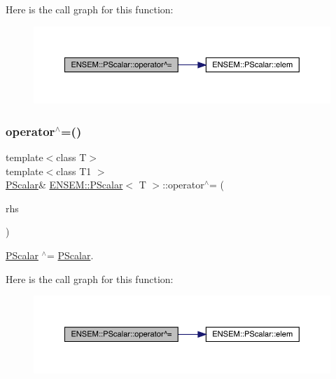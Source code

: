 Here is the call graph for this function\+:
\nopagebreak
\begin{figure}[H]
\begin{center}
\leavevmode
\includegraphics[width=350pt]{d3/d27/classENSEM_1_1PScalar_a3f256371cc925f01209559addfcbb632_cgraph}
\end{center}
\end{figure}
\mbox{\label{classENSEM_1_1PScalar_a3f256371cc925f01209559addfcbb632}} 
\subsubsection{\texorpdfstring{operator$^\wedge$=()}{operator^=()}\hspace{0.1cm}{\footnotesize\ttfamily [2/3]}}
{\footnotesize\ttfamily template$<$class T$>$ \\
template$<$class T1 $>$ \\
\mbox{\hyperlink{classENSEM_1_1PScalar}{P\+Scalar}}\& \mbox{\hyperlink{classENSEM_1_1PScalar}{E\+N\+S\+E\+M\+::\+P\+Scalar}}$<$ T $>$\+::operator$^\wedge$= (\begin{DoxyParamCaption}\item[{const \mbox{\hyperlink{classENSEM_1_1PScalar}{P\+Scalar}}$<$ T1 $>$ \&}]{rhs }\end{DoxyParamCaption})\hspace{0.3cm}{\ttfamily [inline]}}



\mbox{\hyperlink{classENSEM_1_1PScalar}{P\+Scalar}} $^\wedge$= \mbox{\hyperlink{classENSEM_1_1PScalar}{P\+Scalar}}. 

Here is the call graph for this function\+:
\nopagebreak
\begin{figure}[H]
\begin{center}
\leavevmode
\includegraphics[width=350pt]{d3/d27/classENSEM_1_1PScalar_a3f256371cc925f01209559addfcbb632_cgraph}
\end{center}
\end{figure}
\mbox{\label{classENSEM_1_1PScalar_a3f256371cc925f01209559addfcbb632}} 
